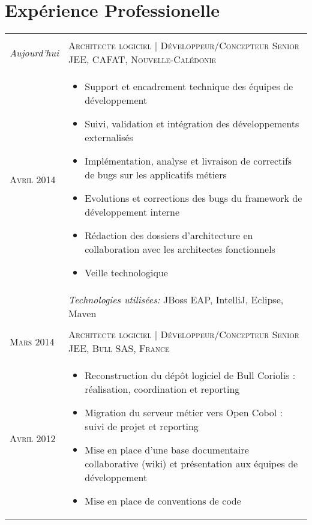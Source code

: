 \section{\texorpdfstring{\color{Blue}Expérience Professionelle}{Expérience Professionelle}}
\begin{longtable}{R{2.5cm}|p{14.8cm}}
   \\
  \emph{Aujourd'hui} & \textsc{Architecte logiciel | Développeur/Concepteur Senior JEE, CAFAT, Nouvelle-Calédonie}\\
  \textsc{Avril 2014} & 
  \vspace{-1em}
  \footnotesize{
    \begin{itemize}
      \item Support et encadrement technique des équipes de développement
      \item Suivi, validation et intégration des développements externalisés
      \item Implémentation, analyse et livraison de correctifs de bugs sur les applicatifs métiers
      \item Evolutions et corrections des bugs du framework de développement interne
      \item Rédaction des dossiers d'architecture en collaboration avec les architectes fonctionnels
      \item Veille technologique
    \end{itemize}
    \vspace{-2em}
  }\\& 
  \footnotesize{\emph{Technologies utilisées:} JBoss EAP, IntelliJ, Eclipse, Maven }\\
  \\
  \textsc{Mars 2014} & \textsc{Architecte logiciel | Développeur/Concepteur Senior JEE, Bull SAS, France}\\
  \textsc{Avril 2012} & 
  \vspace{-1em}
  \footnotesize{
    \begin{itemize}
      \item Reconstruction du dépôt logiciel de Bull Coriolis : réalisation, coordination et reporting
      \item Migration du serveur métier vers Open Cobol : suivi de projet et reporting
      \item Mise en place d'une base documentaire collaborative (wiki) et présentation aux 
      équipes de développement
      \item Mise en place de conventions de code

\end{itemize}}
\end{longtable}
